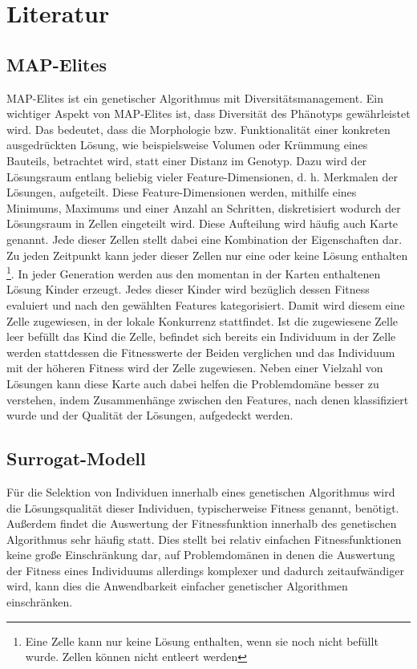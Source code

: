 \documentclass[12pt]{article}
\begin{document}
\section{Literatur}

\subsection{MAP-Elites}
\label{sub:mapElites}
MAP-Elites \cite{Mouret.4202015} ist ein genetischer Algorithmus mit Diversitätsmanagement.
Ein wichtiger Aspekt von MAP-Elites ist, dass Diversität des Phänotyps gewährleistet wird.
Das bedeutet, dass die Morphologie bzw. Funktionalität einer konkreten ausgedrückten Lösung, wie beispielsweise Volumen oder Krümmung eines Bauteils, betrachtet wird, statt einer Distanz im Genotyp.
Dazu wird der Lösungsraum entlang beliebig vieler Feature-Dimensionen, d. h. Merkmalen der Lösungen, aufgeteilt.
Diese Feature-Dimensionen werden, mithilfe eines Minimums, Maximums und einer Anzahl an Schritten, diskretisiert wodurch der Lösungsraum in Zellen eingeteilt wird.
Diese Aufteilung wird häufig auch Karte genannt.
Jede dieser Zellen stellt dabei eine Kombination der Eigenschaften dar.
Zu jeden Zeitpunkt kann jeder dieser Zellen nur eine oder keine Lösung enthalten
\footnote{Eine Zelle kann nur keine Lösung enthalten, wenn sie noch nicht befüllt wurde. Zellen können nicht entleert werden}.
In jeder Generation werden aus den momentan in der Karten enthaltenen Lösung Kinder erzeugt.
Jedes dieser Kinder wird bezüglich dessen Fitness evaluiert und nach den gewählten Features kategorisiert.
Damit wird diesem eine Zelle zugewiesen, in der lokale Konkurrenz stattfindet.
Ist die zugewiesene Zelle leer befüllt das Kind die Zelle, befindet sich bereits ein Individuum in der Zelle werden stattdessen die Fitnesswerte der Beiden verglichen und das Individuum mit der höheren Fitness wird der Zelle zugewiesen.
Neben einer Vielzahl von Lösungen kann diese Karte auch dabei helfen die Problemdomäne besser zu verstehen, indem Zusammenhänge zwischen den Features, nach denen klassifiziert wurde und der Qualität der Lösungen, aufgedeckt werden.

\subsection{Surrogat-Modell}
\label{sub:surrogate}
Für die Selektion von Individuen innerhalb eines genetischen Algorithmus wird die Lösungsqualität dieser Individuen, typischerweise Fitness genannt, benötigt.
Außerdem findet die Auswertung der Fitnessfunktion innerhalb des genetischen Algorithmus sehr häufig statt.
Dies stellt bei relativ einfachen Fitnessfunktionen keine große Einschränkung dar, auf Problemdomänen in denen die Auswertung der Fitness eines Individuums allerdings komplexer und dadurch zeitaufwändiger wird, kann dies die Anwendbarkeit einfacher genetischer Algorithmen einschränken.
\end{document}
